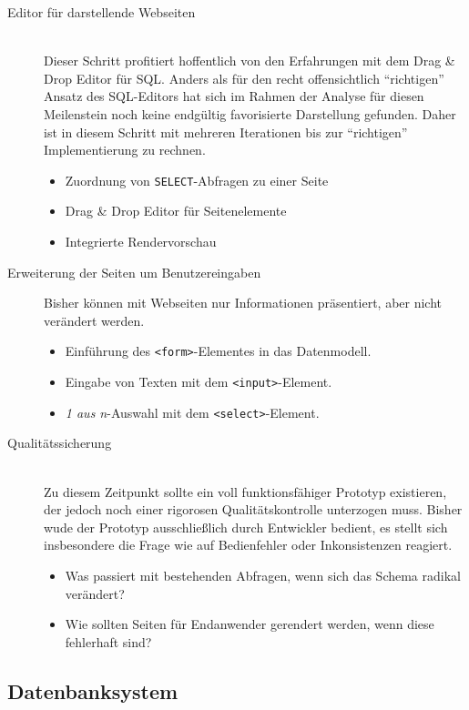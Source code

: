 \begin{description}
\item [Editor für darstellende Webseiten] \hfill \\
  Dieser Schritt profitiert hoffentlich von den Erfahrungen mit dem Drag \& Drop Editor für SQL. Anders als für den recht offensichtlich "`richtigen"' Ansatz des SQL-Editors hat sich im Rahmen der Analyse für diesen Meilenstein noch keine endgültig favorisierte Darstellung gefunden. Daher ist in diesem Schritt mit mehreren Iterationen bis zur "`richtigen"' Implementierung zu rechnen.
  \begin{itemize}
  \item Zuordnung von \texttt{SELECT}-Abfragen zu einer Seite
  \item Drag \& Drop Editor für Seitenelemente
  \item Integrierte Rendervorschau
  \end{itemize}
  
\item[Erweiterung der Seiten um Benutzereingaben]
  Bisher können mit Webseiten nur Informationen präsentiert, aber nicht verändert werden.
  \begin{itemize}
  \item Einführung des \texttt{<form>}-Elementes in das Datenmodell.
  \item Eingabe von Texten mit dem \texttt{<input>}-Element.
  \item \textit{1 aus n}-Auswahl mit dem \texttt{<select>}-Element.
  \end{itemize}
  
\item [Qualitätssicherung] \hfill \\
  Zu diesem Zeitpunkt sollte ein voll funktionsfähiger Prototyp existieren, der jedoch noch einer rigorosen Qualitätskontrolle unterzogen muss. Bisher wude der Prototyp ausschließlich durch Entwickler bedient, es stellt sich insbesondere die Frage wie \idename auf Bedienfehler oder Inkonsistenzen reagiert.
  \begin{itemize}
  \item Was passiert mit bestehenden Abfragen, wenn sich das Schema radikal verändert?
  \item Wie sollten Seiten für Endanwender gerendert werden, wenn diese fehlerhaft sind?
  \end{itemize}
\end{description}

\subsection{Datenbanksystem}
\label{sec:implementation-database-system}

